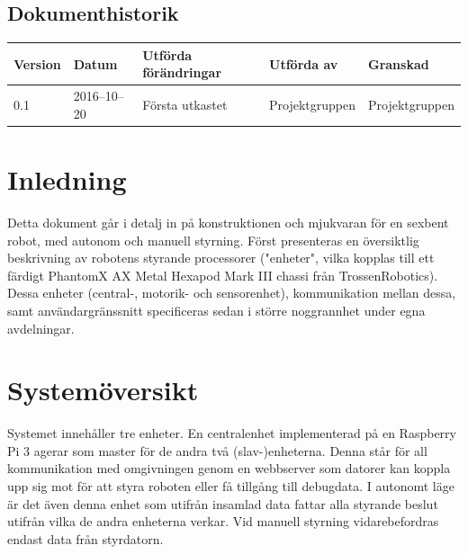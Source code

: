 \documentclass[a4paper,titlepage,12pt]{article}
\begin{document}
\begin{center}

		\section*{Dokumenthistorik}
		\renewcommand*{\arraystretch}{1.4}
        \begin{longtable}[c]{ l l >{\raggedright}p{5cm} >{\raggedright}p{3cm} l }
			\textbf{Version} & \textbf{Datum} & \textbf{Utförda förändringar} 
			& \textbf{Utförda av} & \textbf{Granskad} \\ \midrule
			
			0.1 & 2016--10--20 & Första utkastet & Projektgruppen &
            Projektgruppen \\
            
		\end{longtable}
	\end{center}


	\newpage

	\raggedright

	\section{Inledning}
	Detta dokument går i detalj in på konstruktionen och mjukvaran för en 
	sexbent robot, med autonom och manuell styrning. Först presenteras en 
	översiktlig beskrivning av robotens styrande processorer ("enheter", vilka kopplas till ett färdigt 
	PhantomX AX Metal Hexapod Mark III chassi från TrossenRobotics). Dessa enheter (central-, 
	motorik- och sensorenhet), kommunikation mellan dessa, samt användargränssnitt specificeras 
	sedan i större noggrannhet under egna avdelningar.


	\section{Systemöversikt}
	Systemet innehåller tre enheter. En centralenhet implementerad på en Raspberry Pi 3 
	agerar som master för de andra två (slav-)enheterna. Denna står för all kommunikation 
	med omgivningen genom en webbserver som datorer kan koppla upp sig mot för att styra roboten 
	eller få tillgång till debugdata. I autonomt läge är det även denna enhet som utifrån 
	insamlad data fattar alla styrande beslut utifrån vilka de andra enheterna 
	verkar. Vid manuell styrning vidarebefordras endast data från styrdatorn.
\end{document}
